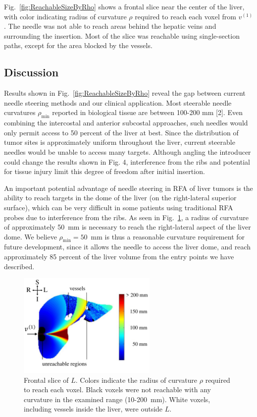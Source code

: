 Fig.~\ref{fig:ReachableSizeByRho} shows a frontal slice near the center of the liver, with color indicating radius of curvature $\rho$ required to reach each voxel from $v^{(1)}$. The needle was not able to reach areas behind the hepatic veins and surrounding the insertion. Most of the slice was reachable using single-section paths, except for the area blocked by the vessels.

\subsection{Discussion}
Results shown in Fig.~\ref{fig:ReachableSizeByRho} reveal the gap between current needle steering methods and our clinical application. Most steerable needle curvatures $\rho_{\text{min}}$ reported in biological tissue are between 100-200 mm [2]. Even combining the intercostal and anterior subcostal approaches, such needles would only permit access to 50 percent of the liver at best. Since the distribution of tumor sites is approximately uniform throughout the liver, current steerable needles would be unable to access many targets. Although angling the introducer could change the results shown in Fig. 4, interference from the ribs and potential for tissue injury limit this degree of freedom after initial insertion. 

An important potential advantage of needle steering in RFA of liver tumors is the ability to reach targets in the dome of the liver (on the right-lateral superior surface), which can be very difficult in some patients using traditional RFA probes due to interference from the ribs. As seen in Fig.~\ref{fig:FrontalSlice}, a radius of curvature of approximately 50~mm is necessary to reach the right-lateral aspect of the liver dome. We believe $\rho_{\text{min}} = 50$~mm is thus a reasonable curvature requirement for future development, since it allows the needle to access the liver dome, and reach approximately 85 percent of the liver volume from the entry points we have described.
  
\begin{figure}[!t]
\centering
\includegraphics[width = 0.6\textwidth]{Images/Chapter3/FrontalSlice/FrontalSlice}%
\caption[Visualization of reachable set size]{Frontal slice of $L$. Colors indicate the radius of curvature $\rho$ required to reach each voxel. Black voxels were not reachable with any curvature in the examined range (10-200~mm). White voxels, including vessels inside the liver, were outside $L$.}
\label{fig:FrontalSlice}
\end{figure}  

